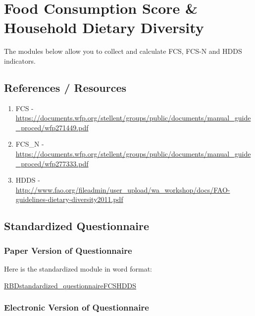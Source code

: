 \documentclass[
]{book}
\begin{document}
\hypertarget{food-consumption-score-household-dietary-diversity}{%
\chapter{Food Consumption Score \& Household Dietary Diversity}\label{food-consumption-score-household-dietary-diversity}}

The modules below allow you to collect and calculate FCS, FCS-N and HDDS indicators.

\hypertarget{references-resources-2}{%
\section{References / Resources}\label{references-resources-2}}

\begin{enumerate}
\def\labelenumi{\arabic{enumi}.}
\item
  FCS - \url{https://documents.wfp.org/stellent/groups/public/documents/manual_guide_proced/wfp271449.pdf}
\item
  FCS\_N - \url{https://documents.wfp.org/stellent/groups/public/documents/manual_guide_proced/wfp277333.pdf}
\item
  HDDS - \url{http://www.fao.org/fileadmin/user_upload/wa_workshop/docs/FAO-guidelines-dietary-diversity2011.pdf}
\end{enumerate}

\hypertarget{standardized-questionnaire-2}{%
\section{Standardized Questionnaire}\label{standardized-questionnaire-2}}

\hypertarget{paper-version-of-questionnaire-2}{%
\subsection{Paper Version of Questionnaire}\label{paper-version-of-questionnaire-2}}

Here is the standardized module in word format:

\href{https://github.com/WFP-VAM/RBD_FS_CH_guide_EN/blob/master/questionnaires/RBDstandardized_questionnaireFCSHDDS.docx}{RBDstandardized\_questionnaireFCSHDDS}

\hypertarget{electronic-version-of-questionnaire-2}{%
\subsection{Electronic Version of Questionnaire}\label{electronic-version-of-questionnaire-2}}
\end{document}

